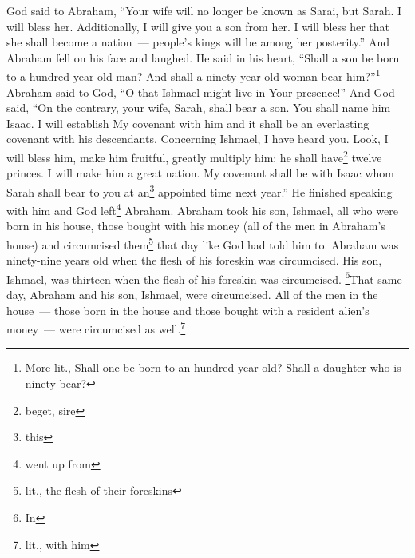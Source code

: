 \begin{inparaenum}
     God said to Abraham, ``Your wife will no longer be known as Sarai, but Sarah.%
     I will bless her. Additionally, I will give you a son from her. I will bless her that she shall become a nation~--- people's kings will be among her posterity.''%
     And Abraham fell on his face and laughed. He said in his heart, ``Shall a son be born to a hundred year old man? And shall a ninety year old woman bear him?''\footnote{More lit., Shall one be born to an hundred year old? Shall a daughter who is ninety bear?}%
     Abraham said to God, ``O that Ishmael might live in Your presence!''%
     And God said, ``On the contrary, your wife, Sarah, shall bear a son. You shall name him Isaac. I will establish My covenant with him and it shall be an everlasting covenant with his descendants.%
     Concerning Ishmael, I have heard you. Look, I will bless him, make him fruitful, greatly multiply him: he shall have\footnote{beget, sire} twelve princes. I will make him a great nation.%
     My covenant shall be with Isaac whom Sarah shall bear to you at an\footnote{this} appointed time next year.''%
     He finished speaking with him and God left\footnote{went up from} Abraham.%
     Abraham took his son, Ishmael, all who were born in his house, those bought with his money (all of the men in Abraham's house) and circumcised them\footnote{lit., the flesh of their foreskins} that day like God had told him to.%
     Abraham was ninety-nine years old when the flesh of his foreskin was circumcised.%
     His son, Ishmael, was thirteen when the flesh of his foreskin was circumcised.%
     \footnote{In}That same day, Abraham and his son, Ishmael, were circumcised.%
     All of the men in the house~--- those born in the house and those bought with a resident alien's money~--- were circumcised as well.\footnote{lit., with him}%
\end{inparaenum}
